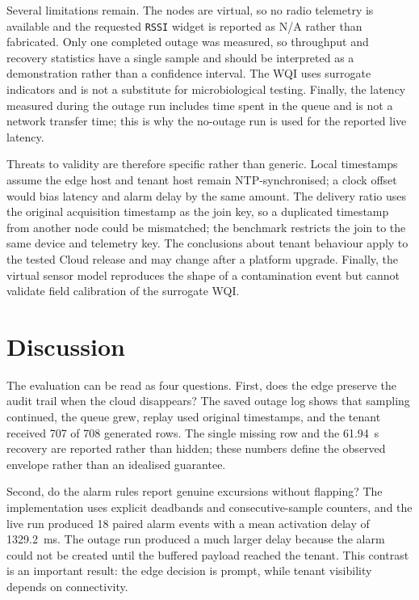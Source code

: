 \documentclass[conference]{IEEEtran}
\begin{document}
Several limitations remain. The nodes are virtual, so no radio telemetry is
available and the requested \texttt{RSSI} widget is reported as N/A rather than
fabricated. Only one completed outage was measured, so throughput and recovery
statistics have a single sample and should be interpreted as a demonstration
rather than a confidence interval. The WQI uses surrogate indicators and is not
a substitute for microbiological testing. Finally, the latency measured during
the outage run includes time spent in the queue and is not a network transfer
time; this is why the no-outage run is used for the reported live latency.

Threats to validity are therefore specific rather than generic. Local timestamps
assume the edge host and tenant host remain NTP-synchronised; a clock offset
would bias latency and alarm delay by the same amount. The delivery ratio uses
the original acquisition timestamp as the join key, so a duplicated timestamp
from another node could be mismatched; the benchmark restricts the join to the
same device and telemetry key. The conclusions about tenant behaviour apply to
the tested Cloud release and may change after a platform upgrade. Finally, the
virtual sensor model reproduces the shape of a contamination event but cannot
validate field calibration of the surrogate WQI.

\section{Discussion}
\label{sec:discussion}

The evaluation can be read as four questions. First, does the edge preserve the
audit trail when the cloud disappears? The saved outage log shows that sampling
continued, the queue grew, replay used original timestamps, and the tenant
received 707 of 708 generated rows. The single missing row and the 61.94~s
recovery are reported rather than hidden; these numbers define the observed
envelope rather than an idealised guarantee.

Second, do the alarm rules report genuine excursions without flapping? The
implementation uses explicit deadbands and consecutive-sample counters, and the
live run produced 18 paired alarm events with a mean activation delay of
1329.2~ms. The outage run produced a much larger delay because the alarm could
not be created until the buffered payload reached the tenant. This contrast is
an important result: the edge decision is prompt, while tenant visibility
depends on connectivity.
\end{document}
